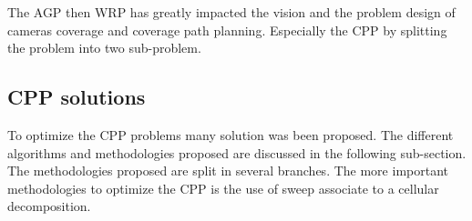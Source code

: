 The AGP then WRP has greatly impacted the vision and the problem design of cameras coverage and coverage path planning. Especially the CPP by splitting the problem into two sub-problem.  



 


%
%
%

\subsection{CPP solutions}



To optimize the CPP problems many solution was been proposed. The different algorithms and methodologies proposed are discussed in the following sub-section. The methodologies proposed are  split in several branches. 
The more important methodologies to optimize the CPP is the use of sweep associate to a cellular decomposition.
%
%

